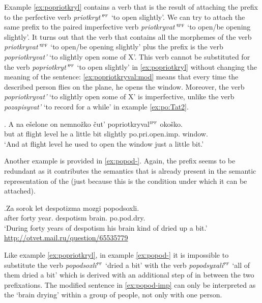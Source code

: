 Example \ref{ex:popriotkryl} contains a verb that is the result of attaching the  prefix  to the perfective verb \textit{priotkryt'}$^{\textsc{pf}}$ `to open slightly'. We can try to attach the same prefix to the paired imperfective verb \textit{priotkryvat'}$^{\textsc{ipf}}$ `to open/be opening slightly'. It turns out that the verb that contains all the morphemes of the verb \textit{priotkryvat'}$^{\textsc{ipf}}$ `to open/be opening slightly' plus the prefix  is the verb \textit{popriotkryvat'} `to slightly open some of X'. This verb cannot be substituted for the verb \textit{popriotkryt'}$^{\textsc{pf}}$ `to open slightly' in \ref{ex:popriotkryl} without changing the meaning of the sentence: \ref{ex:popriotkryval:mod} means that every time the described person flies on the plane, he opens the window. Moreover, the verb \textit{popriotkryvat'} `to slightly open some of X' is imperfective, unlike the verb \textit{pozapisyvat'} `to record for a while' in example \ref{ex:po:Tat2}.

\exg. \label{ex:popriotkryval:mod}A na e\v{s}elone on nemno\v{z}ko \v{c}ut' popriotkryval$^{\textsc{ipf}}$ oko\v{s}ko.\\
but at {flight level} he {a little bit} {slightly} po.pri.open.imp. window.\\
\trans `And at flight level he used to open the window just a little bit.'

Another example is provided in \ref{ex:popod-}. Again, the  prefix  seems to be redundant as it contributes the  semantics that is already present in the semantic representation of the  (just because this is the condition under which it can be attached).

\exg.\label{ex:popod-}Za sorok let despotizma mozgi popodsoxli.\\
after forty year. despotism brain. po.pod.dry.\\
\trans `During forty years of despotism his brain kind of dried up a bit.'\\\hbox{}\hfill\hbox{\url{http://otvet.mail.ru/question/65535779}}

Like example \ref{ex:popriotkryl}, in example \ref{ex:popod-} it is impossible to substitute the verb \textit{popodsoxli}$^{\textsc{pf}}$ `dried a bit' with the verb \textit{popodsyxali}$^{\textsc{pf}}$ `all of them dried a bit' which is derived with an additional step of  in between the two prefixations. The modified sentence in \ref{ex:popod-imp} can only be interpreted as the `brain drying' within a group of people, not only with one person.  

